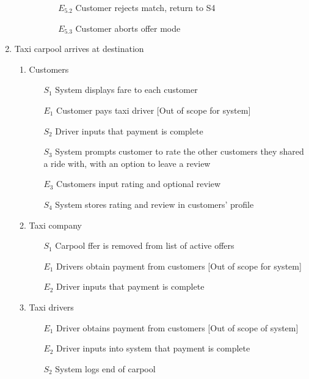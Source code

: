 \documentclass[]{article}
\begin{document}
\begin{enumerate}[{\textbf{BE}}1.]
\begin{enumerate}[{\textbf{VP5}}.1]
\begin{enumerate}
\begin{enumerate}
                \item[$E_{5.2}$] Customer rejects match, return to S4
                \item[$E_{5.3}$] Customer aborts offer mode
                 \end{enumerate}
            \end{enumerate}
    \end{enumerate}
    \item Taxi carpool arrives at destination
    \begin{enumerate}[{\textbf{VP6}}.1]
        \item Customers
            \begin{enumerate}
                \item[$S_1$] System displays fare to each customer
                \item[$E_1$] Customer pays taxi driver [Out of scope for system]
		   \item[$S_2$] Driver inputs that payment is complete
                \item[$S_3$] System prompts customer to rate the other customers they shared a ride with, with an option to leave a review
                \item[$E_3$] Customers input rating and optional review
                \item[$S_4$] System stores rating and review in customers’ profile
            \end{enumerate}
        \item Taxi company
            \begin{enumerate}
                \item[$S_1$] Carpool ffer is removed from list of active offers
                \item[$E_1$] Drivers obtain payment from customers [Out of scope for system]
                \item[$E_2$] Driver inputs that payment is complete
            \end{enumerate}
        \item Taxi drivers
            \begin{enumerate}
                \item[$E_1$] Driver obtains payment from customers [Out of scope of system]
                \item[$E_2$] Driver inputs into system that payment is complete
                \item[$S_2$] System logs end of carpool
            \end{enumerate}

\end{enumerate}
\end{enumerate}
\end{document}
